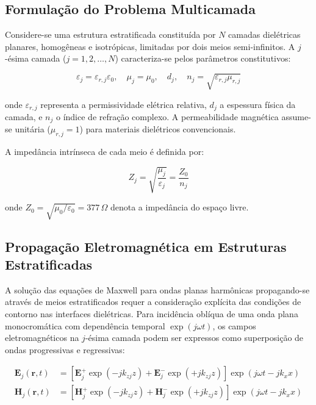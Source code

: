 \documentclass[11pt,a4paper]{article}
\begin{document}
\subsection{Formulação do Problema Multicamada}

Considere-se uma estrutura estratificada constituída por $N$ camadas dielétricas planares, homogêneas e isotrópicas, limitadas por dois meios semi-infinitos. A $j$-ésima camada ($j = 1, 2, \ldots, N$) caracteriza-se pelos parâmetros constitutivos:

\begin{equation}
\varepsilon_j = \varepsilon_{r,j}\varepsilon_0, \quad \mu_j = \mu_0, \quad d_j, \quad n_j = \sqrt{\varepsilon_{r,j}\mu_{r,j}}
\end{equation}

onde $\varepsilon_{r,j}$ representa a permissividade elétrica relativa, $d_j$ a espessura física da camada, e $n_j$ o índice de refração complexo. A permeabilidade magnética assume-se unitária ($\mu_{r,j} = 1$) para materiais dielétricos convencionais.

A impedância intrínseca de cada meio é definida por:

\begin{equation}
Z_j = \sqrt{\frac{\mu_j}{\varepsilon_j}} = \frac{Z_0}{n_j}
\end{equation}

onde $Z_0 = \sqrt{\mu_0/\varepsilon_0} = 377\,\Omega$ denota a impedância do espaço livre.

\subsection{Propagação Eletromagnética em Estruturas Estratificadas}

A solução das equações de Maxwell para ondas planas harmônicas propagando-se através de meios estratificados requer a consideração explícita das condições de contorno nas interfaces dielétricas. Para incidência oblíqua de uma onda plana monocromática com dependência temporal $\exp(j\omega t)$, os campos eletromagnéticos na $j$-ésima camada podem ser expressos como superposição de ondas progressivas e regressivas:

\begin{align}
\mathbf{E}_j(\mathbf{r},t) &= [\mathbf{E}_j^+ \exp(-jk_{zj}z) + \mathbf{E}_j^- \exp(+jk_{zj}z)] \exp(j\omega t - jk_x x) \\
\mathbf{H}_j(\mathbf{r},t) &= [\mathbf{H}_j^+ \exp(-jk_{zj}z) + \mathbf{H}_j^- \exp(+jk_{zj}z)] \exp(j\omega t - jk_x x)
\end{align}
\end{document}
